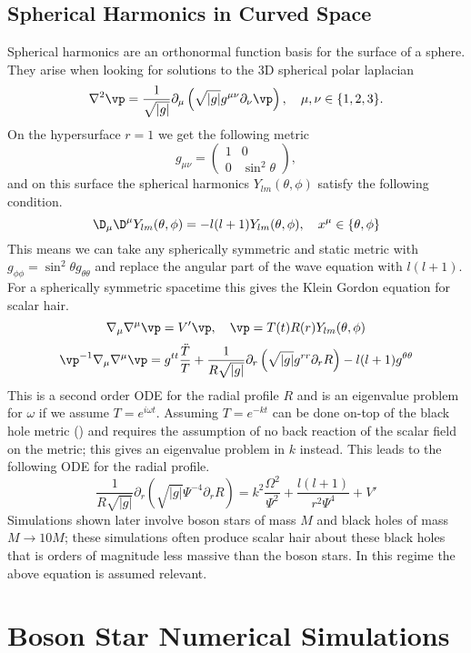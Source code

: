  \subsection{Spherical Harmonics in Curved Space}
 Spherical harmonics are an orthonormal function basis for the surface of a sphere. They arise when looking for solutions to the 3D spherical polar laplacian
 \[ \nabla^2 \vp= \frac{1}{\sqrt{|g|}}\partial_{\mu}\left( \sqrt{|g|}g^{\mu\nu}\partial_\nu \vp\right), \quad \mu,\nu \in \{1,2,3\} .\]
 On the hypersurface $r=1$ we get the following metric
 \[ g_{\mu\nu} = \begin{pmatrix} 1 & 0 \\ 0 & \sin^2 \theta\end{pmatrix},\]
 and on this surface the spherical harmonics $Y_{lm}(\theta,\phi)$ satisfy the following condition.
 \[ \D_\mu \D^\mu Y_{lm}(\theta,\phi) = -l(l+1)Y_{lm}(\theta,\phi), \quad x^\mu \in \{\theta,\phi\}\] 
 This means we can take any spherically symmetric and static metric with $g_{\phi\phi} = \sin^2\theta g_{\theta\theta}$ and replace the angular part of the wave equation with $l(l+1)$. For a spherically symmetric spacetime this gives the Klein Gordon equation for scalar hair.
 \[ \nabla_\mu \nabla^\mu \vp = V' \vp, \quad \vp = T(t)R(r)Y_{lm}(\theta,\phi)\]
 \[\vp^{-1}\nabla_\mu \nabla^\mu \vp = g^{tt}\frac{\ddot{T}}{T} +  \frac{1}{R\sqrt{|g|}}\partial_{r}\left( \sqrt{|g|}g^{rr}\partial_r R\right) -{l(l+1)}g^{\theta\theta} \]
 This is a second order ODE for the radial profile $R$ and is an eigenvalue problem for $\omega$ if we assume $T=e^{i\omega t}$. Assuming $T=e^{-kt}$ can be done on-top of the black hole metric () and requires the assumption of no back reaction of the scalar field on the metric; this gives an eigenvalue problem in $k$ instead. This leads to the following ODE for the radial profile. 
 \begin{equation} \frac{1}{R\sqrt{|g|}}\partial_{r}\left( \sqrt{|g|}\Psi^{-4}\partial_r R\right)  = k^2 \frac{\Omega^2}{\Psi^2} + \frac{l(l+1)}{r^2 \Psi^4} + V'\end{equation}
Simulations shown later involve boson stars of mass $M$ and black holes of mass $M\rightarrow 10M$; these simulations often produce scalar hair about these black holes that is orders of magnitude less massive than the boson stars. In this regime the above equation is assumed relevant.


\section{Boson Star Numerical Simulations}
